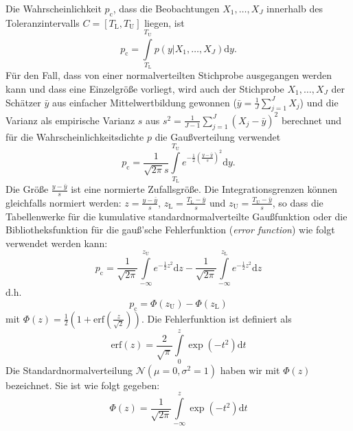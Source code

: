 Die Wahrscheinlichkeit $p_\mathrm{c}$, dass die Beobachtungen ${X_1,\dots,X_J}$ innerhalb des Toleranzintervalls
$C = [T_\mathrm{L}, T_\mathrm{U}]$ liegen, ist
\begin{equation}
	p_\mathrm{c} =  \int\limits_{T_\mathrm{L}}^{T_\mathrm{U}} p(y|{X_1,\dots,X_J}) \mathrm{d}y.
\end{equation}
Für den Fall, dass von einer normalverteilten Stichprobe ausgegangen werden kann und dass eine Einzelgröße
vorliegt, wird auch der Stichprobe ${X_1,\dots,X_J}$ der Schätzer $\bar y$ aus einfacher Mittelwertbildung
gewonnen ($\bar y = \frac{1}{J} \sum\limits_{j=1}^J X_j$) und die Varianz als empirische Varianz $s$ aus
$s^2 = \frac{1}{J-1}\sum\limits_{j=1}^J (X_j - \bar y)^2$ berechnet
und für die Wahrscheinlichkeitsdichte $p$ die Gaußverteilung verwendet
\begin{equation}
	p_\mathrm{c} = \frac{1}{\sqrt{2 \pi} s} \int\limits_{T_\mathrm{L}}^{T_\mathrm{U}}
	e^{-\frac{1}{2}\left(\frac{y - \bar y}{s}\right)^2} \mathrm{d}y .
		\label{eq:Konformitaetswahrscheinlichkeit}
\end{equation}
Die Größe $\frac{y - \bar y}{s}$ ist eine normierte Zufallsgröße. Die Integrationsgrenzen können gleichfalls
normiert werden: $z = \frac{y - \bar y}{s}$, $z_\mathrm{L} = \frac{T_\mathrm{L} - \bar y}{s}$ und
$z_\mathrm{U} = \frac{T_\mathrm{U} - \bar y}{s}$, so dass die Tabellenwerke für die kumulative
standardnormalverteilte Gaußfunktion oder die Bibliotheksfunktion
für die gauß'sche Fehlerfunktion (\textsl{error function}) wie folgt verwendet werden kann:
\begin{equation}
	p_\mathrm{c} = \frac{1}{\sqrt{2 \pi}} \int\limits_{-\infty}^{z_\mathrm{U}}
	e^{-\frac{1}{2} z^2} \mathrm{d}z -
	\frac{1}{\sqrt{2 \pi}} \int\limits_{-\infty}^{z_\mathrm{L}} e^{-\frac{1}{2} z^2} \mathrm{d}z
\end{equation}
d.h.
\begin{equation}
	p_\mathrm{c} = \Phi(z_\mathrm{U}) - \Phi(z_\mathrm{L})
\end{equation}
mit $\Phi(z) = \frac{1}{2} \left(1 + \mathrm{erf}\left(\frac{z}{\sqrt{2}}\right) \right)$. Die Fehlerfunktion ist definiert als
\begin{equation}
	\mathrm{erf}(z)= \frac{2}{\sqrt{\pi}}\int\limits_{0}^{z} \exp (-t^2)\mathrm{d}t
\end{equation}
Die Standardnormalverteilung $\mathcal{N}(\mu=0,\sigma^2=1)$ haben wir mit $\Phi(z)$ bezeichnet. Sie ist wie folgt gegeben:
\begin{equation}
	\Phi(z)= \frac{1}{\sqrt{2\pi}}\int\limits_{-\infty}^{z} \exp (-t^2)\mathrm{d}t
\end{equation}
